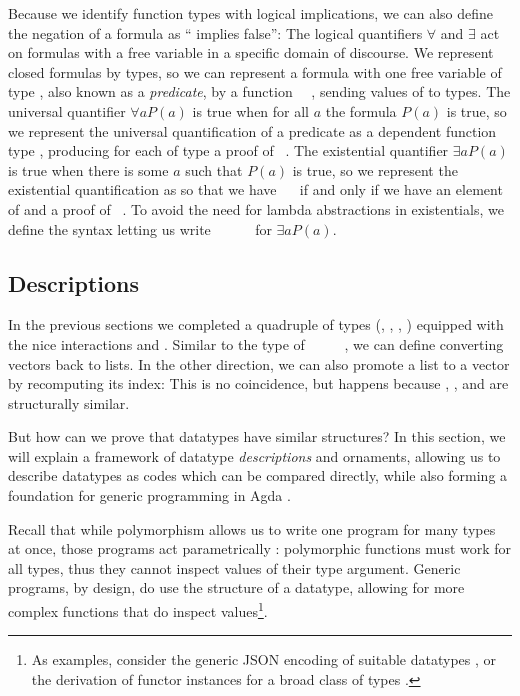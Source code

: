 Because we identify function types with logical implications, we can also define the negation of a formula  as `` implies false'':
The logical quantifiers $\forall$ and $\exists$ act on formulas with a free variable in a specific domain of discourse. We represent closed formulas by types, so we can represent a formula with one free variable of type , also known as a \emph{predicate}, by a function \ \ , sending values of  to types. The universal quantifier $\forall a P(a)$ is true when for all $a$ the formula $P(a)$ is true, so we represent the universal quantification of a predicate  as a dependent function type , producing for each  of type  a proof of \ . The existential quantifier $\exists a P(a)$ is true when there is some $a$ such that $P(a)$ is true, so we represent the existential quantification as
so that we have \ \  if and only if we have an element  of  and a proof  of \ . To avoid the need for lambda abstractions in existentials, we define the syntax
letting us write \AD{Σ[}\ \ \ \ \AD{]}\  for $\exists a P(a)$.

\subsection{Descriptions}\label{sec:background-descriptions}
In the previous sections we completed a quadruple of types (\bN{}, , , ) equipped with the nice interactions  and . Similar to the type of \ \AV{:}\ \ \ \ \bN{}, we can define
converting vectors back to lists. In the other direction, we can also promote a list to a vector by recomputing its index:
This is no coincidence, but happens because \bN{}, , and  are structurally similar.

But how can we prove that datatypes have similar structures? In this section, we will explain a framework of datatype \emph{descriptions} and ornaments, allowing us to describe datatypes as codes which can be compared directly, while also forming a foundation for generic programming in Agda \cite{ulftutorial, genericsamm, effectfully, practgen}. 

Recall that while polymorphism allows us to write one program for many types at once, those programs act parametrically \cite{reynolds1983types, wadlerfree}: polymorphic functions must work for all types, thus they cannot inspect values of their type argument. Generic programs, by design, do use the structure of a datatype, allowing for more complex functions that do inspect values\footnote{As examples, consider the generic JSON encoding of suitable datatypes \cite{truesop}, or the derivation of functor instances for a broad class of types \cite{haskellderiving}.}.

